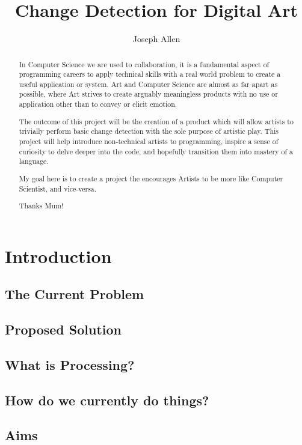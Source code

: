 \documentclass[a4paper]{report}
\title{Change Detection for Digital Art}
\author{Joseph Allen}
\begin{document}
\maketitle

\begin{abstract}
In Computer Science we are used to collaboration, it is a fundamental aspect of programming careers to apply technical skills with a real world problem to create a useful application or system. Art and Computer Science are almost as far apart as possible, where Art strives to create arguably meaningless products with no use or application other than to convey or elicit emotion. 

The outcome of this project will be the creation of a product which will allow artists to trivially perform basic change detection with the sole purpose of artistic play. This project will help introduce non-technical artists to programming, inspire a sense of curiosity to delve deeper into the code, and hopefully transition them into mastery of a language.

My goal here is to create a project the encourages Artists to be more like Computer Scientist, and vice-versa.
\end{abstract}

\renewcommand{\abstractname}{Acknowledgements}
\begin{abstract}
 Thanks Mum!
\end{abstract}

\tableofcontents

\section{Introduction}
\subsection{The Current Problem}
\subsection{Proposed Solution}
\subsection{What is Processing?}
\subsection{How do we currently do things?}
\subsection{Aims}
\end{document}
